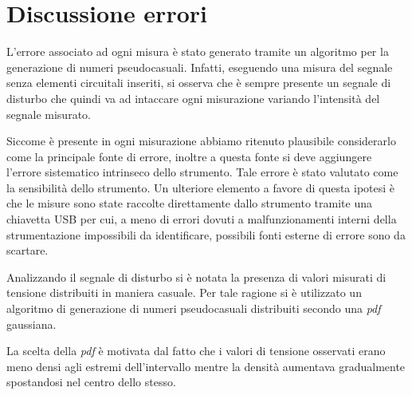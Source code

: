 \section{Discussione errori}
\label{discussione errori}
L'errore associato ad ogni misura è stato generato tramite un algoritmo per la generazione di numeri pseudocasuali. Infatti, eseguendo una misura del segnale senza elementi circuitali inseriti, si osserva che è sempre presente un segnale di disturbo che quindi va ad intaccare ogni misurazione variando l'intensità del segnale misurato.

Siccome è presente in ogni misurazione abbiamo ritenuto plausibile considerarlo come la principale fonte di errore, inoltre a questa fonte si deve aggiungere l'errore sistematico intrinseco dello strumento. Tale errore è stato valutato come la sensibilità dello strumento. Un ulteriore elemento a favore di questa ipotesi è che le misure sono state raccolte direttamente dallo strumento tramite una chiavetta USB per cui, a meno di errori dovuti a malfunzionamenti interni della strumentazione impossibili da identificare, possibili fonti esterne di errore sono da scartare. 

Analizzando il segnale di disturbo si è notata la presenza di valori misurati di tensione distribuiti in maniera casuale. Per tale ragione si è utilizzato un algoritmo di generazione di numeri pseudocasuali distribuiti secondo una \textit{pdf} gaussiana.

La scelta della \textit{pdf} è motivata dal fatto che i valori di tensione osservati erano meno densi agli estremi dell'intervallo mentre la densità aumentava gradualmente spostandosi nel centro dello stesso.


